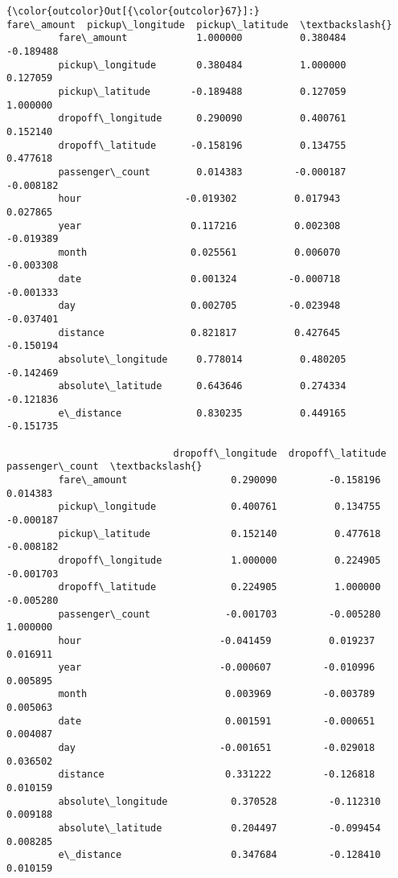 \documentclass[11pt]{article}
\begin{document}
\begin{Verbatim}[commandchars=\\\{\}]
{\color{outcolor}Out[{\color{outcolor}67}]:}                     fare\_amount  pickup\_longitude  pickup\_latitude  \textbackslash{}
         fare\_amount            1.000000          0.380484        -0.189488   
         pickup\_longitude       0.380484          1.000000         0.127059   
         pickup\_latitude       -0.189488          0.127059         1.000000   
         dropoff\_longitude      0.290090          0.400761         0.152140   
         dropoff\_latitude      -0.158196          0.134755         0.477618   
         passenger\_count        0.014383         -0.000187        -0.008182   
         hour                  -0.019302          0.017943         0.027865   
         year                   0.117216          0.002308        -0.019389   
         month                  0.025561          0.006070        -0.003308   
         date                   0.001324         -0.000718        -0.001333   
         day                    0.002705         -0.023948        -0.037401   
         distance               0.821817          0.427645        -0.150194   
         absolute\_longitude     0.778014          0.480205        -0.142469   
         absolute\_latitude      0.643646          0.274334        -0.121836   
         e\_distance             0.830235          0.449165        -0.151735   
         
                             dropoff\_longitude  dropoff\_latitude  passenger\_count  \textbackslash{}
         fare\_amount                  0.290090         -0.158196         0.014383   
         pickup\_longitude             0.400761          0.134755        -0.000187   
         pickup\_latitude              0.152140          0.477618        -0.008182   
         dropoff\_longitude            1.000000          0.224905        -0.001703   
         dropoff\_latitude             0.224905          1.000000        -0.005280   
         passenger\_count             -0.001703         -0.005280         1.000000   
         hour                        -0.041459          0.019237         0.016911   
         year                        -0.000607         -0.010996         0.005895   
         month                        0.003969         -0.003789         0.005063   
         date                         0.001591         -0.000651         0.004087   
         day                         -0.001651         -0.029018         0.036502   
         distance                     0.331222         -0.126818         0.010159   
         absolute\_longitude           0.370528         -0.112310         0.009188   
         absolute\_latitude            0.204497         -0.099454         0.008285   
         e\_distance                   0.347684         -0.128410         0.010159   
         

\end{Verbatim}
\end{document}
